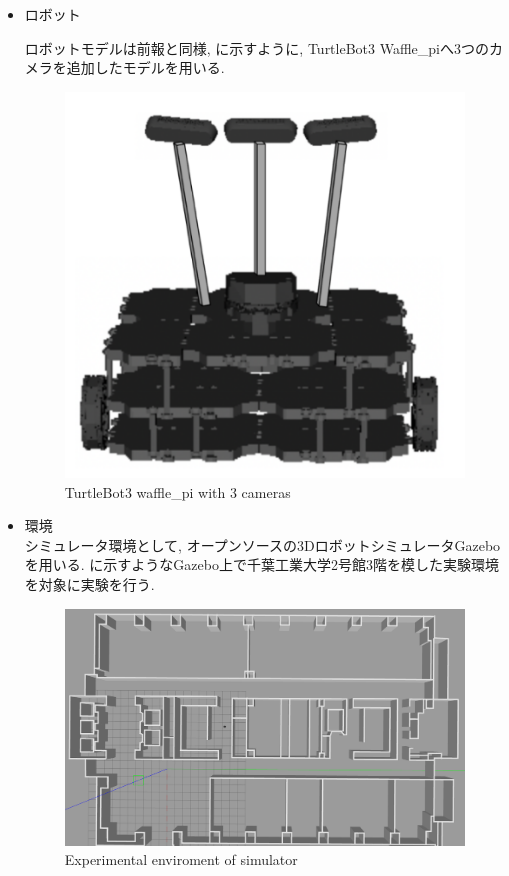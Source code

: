 \begin{itemize}
  \item ロボット

ロボットモデルは前報\cite{okada1}\cite{okada2}と同様, に示すように, TurtleBot3 Waffle\_piへ3つのカメラを追加したモデルを用いる.

\begin{figure}[hbtp]
  \centering
 \includegraphics[keepaspectratio, scale=0.22]
      {images/Waffle_pi.png}
 \caption{TurtleBot3 waffle\_pi with 3 cameras}
 \label{Fig:waffle_pi}
\end{figure}

\item 環境\\
シミュレータ環境として, オープンソースの3DロボットシミュレータGazeboを用いる. に示すようなGazebo上で千葉工業大学2号館3階を模した実験環境を対象に実験を行う.

\begin{figure}[hbtp]
  \centering
 \includegraphics[keepaspectratio, scale=0.12]
      {images/tsudanuma2-3_simorg.png}
 \caption{Experimental enviroment of simulator}
 \label{Fig:sim}
\end{figure}

\end{itemize}

